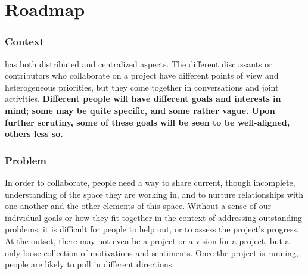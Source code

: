 \section{Roadmap} \label{sec:Roadmap}



\subsubsection*{Context}  has both distributed and centralized aspects. The different discussants or contributors who collaborate on a project have different points of view and heterogeneous priorities, but they come together in conversations and joint activities.
\textbf{Different people will have different goals and interests in mind; some may be quite specific, and some rather vague.  Upon further scrutiny, some of these goals will be seen to be well-aligned, others less so.}

\subsubsection*{Problem} In order to collaborate, people need a way to share current, though incomplete, understanding of the space they are working in, and to nurture relationships with one another and the other elements of this space.  Without a sense of our individual goals or how they fit together in the context of addressing outstanding problems, it is difficult for people to help out, or to assess the 
project's progress.  At the outset, there may not even be a project or a vision for a project, but a only loose collection of motivations and sentiments.  Once the project is running, people are likely to pull in different directions.   

